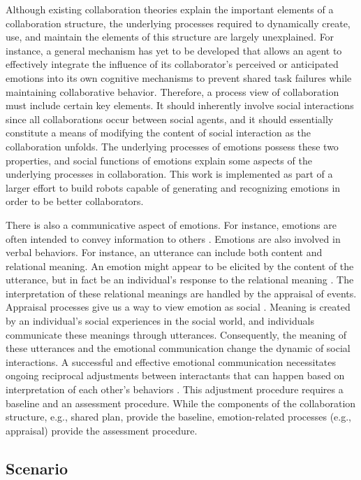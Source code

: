\documentclass[12pt]{report}
\begin{document}
Although existing collaboration theories explain the important elements of a
collaboration structure, the underlying processes required to dynamically
create, use, and maintain the elements of this structure are largely
unexplained. For instance, a general mechanism has yet to be developed that
allows an agent to effectively integrate the influence of its collaborator's
perceived or anticipated emotions into its own cognitive mechanisms to prevent
shared task failures while maintaining collaborative behavior. Therefore, a
process view of collaboration must include certain key elements. It should
inherently involve social interactions since all collaborations occur between
social agents, and it should essentially constitute a means of modifying the
content of social interaction as the collaboration unfolds. The underlying
processes of emotions possess these two properties, and social functions of
emotions explain some aspects of the underlying processes in collaboration.
This work is implemented as part of a larger effort to build robots capable of
generating and recognizing emotions in order to be better collaborators.

There is also a communicative aspect of emotions. For instance, emotions are
often intended to convey information to others \cite{goffman:self-presentation}.
Emotions are also involved in verbal behaviors. For instance, an utterance can
include both content and relational meaning. An emotion might appear to be
elicited by the content of the utterance, but in fact be an individual's
response to the relational meaning \cite{planalp:communicating-emotion}. The
interpretation of these relational meanings are handled by the appraisal of
events. Appraisal processes give us a way to view emotion as social
\cite{hooft:sharing-emotions}. Meaning is created by an individual's social
experiences in the social world, and individuals communicate these meanings
through utterances. Consequently, the meaning of these utterances and the
emotional communication change the dynamic of social interactions. A successful
and effective emotional communication necessitates ongoing reciprocal
adjustments between interactants that can happen based on interpretation of each
other's behaviors \cite{parkinson:emotion-social-interaction}. This adjustment
procedure requires a baseline and an assessment procedure. While the components
of the collaboration structure, e.g., shared plan, provide the baseline,
emotion-related processes (e.g., appraisal) provide the assessment procedure.

\subsection{Scenario}
\end{document}
